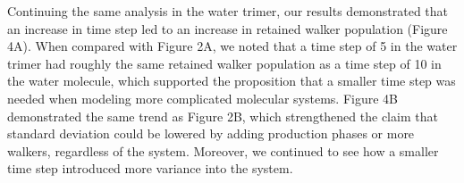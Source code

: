 \documentclass[journal=jacsat,manuscript=article]{achemso}
\newcommand*{\figuretitle}[1]{%
    {\centering%
    \textbf{#1}%
    \par\medskip}%
}
\begin{document}

Continuing the same analysis in the water trimer, our results demonstrated that an increase in time step led to an increase in retained walker population (Figure 4A). When compared with Figure 2A, we noted that a time step of 5 in the water trimer had roughly the same retained walker population as a time step of 10 in the water molecule, which supported the proposition that a smaller time step was needed when modeling more complicated molecular systems. Figure 4B demonstrated the same trend as Figure 2B, which strengthened the claim that standard deviation could be lowered by adding production phases or more walkers, regardless of the system. Moreover, we continued to see how a smaller time step introduced more variance into the system. 

\end{document}
